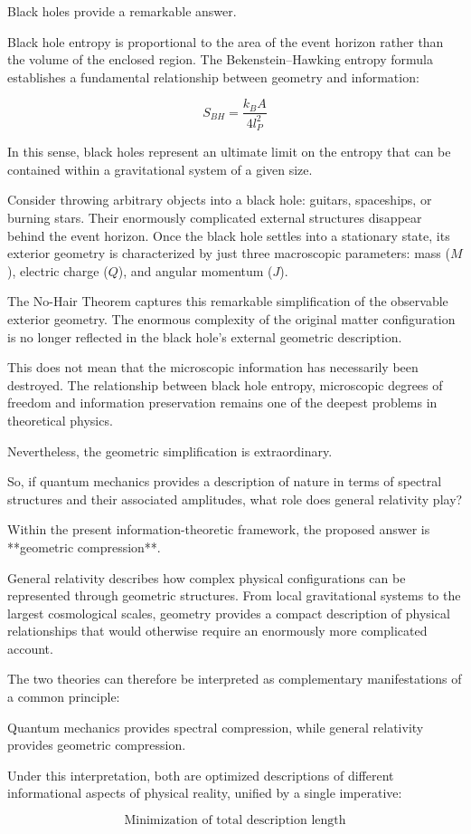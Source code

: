 Black holes provide a remarkable answer.

Black hole entropy is proportional to the area of the event horizon rather than the volume of the enclosed region. The Bekenstein–Hawking entropy formula establishes a fundamental relationship between geometry and information:

\[
S_{BH}=\frac{k_B A}{4l_P^2}
\]

In this sense, black holes represent an ultimate limit on the entropy that can be contained within a gravitational system of a given size.

Consider throwing arbitrary objects into a black hole: guitars, spaceships, or burning stars. Their enormously complicated external structures disappear behind the event horizon.
Once the black hole settles into a stationary state, its exterior geometry is characterized by just three macroscopic parameters: mass ($M$), electric charge ($Q$), and angular momentum ($J$).

The No-Hair Theorem captures this remarkable simplification of the observable exterior geometry. The enormous complexity of the original matter configuration is no longer reflected in the black hole's external geometric description.

This does not mean that the microscopic information has necessarily been destroyed. The relationship between black hole entropy, microscopic degrees of freedom and information preservation remains one of the deepest problems in theoretical physics.

Nevertheless, the geometric simplification is extraordinary.

So, if quantum mechanics provides a description of nature in terms of spectral structures and their associated amplitudes, what role does general relativity play?

Within the present information-theoretic framework, the proposed answer is **geometric compression**.

General relativity describes how complex physical configurations can be represented through geometric structures. From local gravitational systems to the largest cosmological scales, geometry provides a compact description of physical relationships that would otherwise require an enormously more complicated account.

The two theories can therefore be interpreted as complementary manifestations of a common principle:

Quantum mechanics provides spectral compression, while general relativity provides geometric compression.

Under this interpretation, both are optimized descriptions of different informational aspects of physical reality, unified by a single imperative:

\[
\boxed{\text{Minimization of total description length}}
\]


